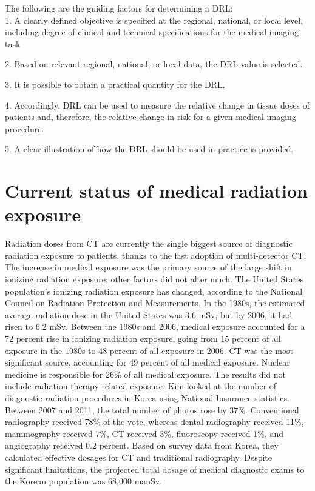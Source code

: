 \documentclass{article}
\begin{document}
The following are the guiding factors for determining a DRL:\\

1.	A clearly defined objective is specified at the regional, national, or local level, including degree of clinical and technical specifications for the medical imaging task

2.	Based on relevant regional, national, or local data, the DRL value is selected. 

3.	It is possible to obtain a practical quantity for the DRL. 

4.	Accordingly, DRL can be used to measure the relative change in tissue doses of patients and, therefore, the relative change in risk for a given medical imaging procedure. 

5.	A clear illustration of how the DRL should be used in practice is provided.

\section{Current status of medical radiation exposure}

\large Radiation doses from CT are currently the single biggest source of diagnostic radiation exposure to patients, thanks to the fast adoption of multi-detector CT. The increase in medical exposure was the primary source of the large shift in ionizing radiation exposure; other factors did not alter much. The United States population's ionizing radiation exposure has changed, according to the National Council on Radiation Protection and Measurements. In the 1980s, the estimated average radiation dose in the United States was 3.6 mSv, but by 2006, it had risen to 6.2 mSv. Between the 1980s and 2006, medical exposure accounted for a 72 percent rise in ionizing radiation exposure, going from 15 percent of all exposure in the 1980s to 48 percent of all exposure in 2006. CT was the most significant source, accounting for 49 percent of all medical exposure. Nuclear medicine is responsible for 26\% of all medical exposure. The results did not include radiation therapy-related exposure. Kim looked at the number of diagnostic radiation procedures in Korea using National Insurance statistics. Between 2007 and 2011, the total number of photos rose by 37\%. Conventional radiography received 78\% of the vote, whereas dental radiography received 11\%, mammography received 7\%, CT received 3\%, fluoroscopy received 1\%, and angiography received 0.2 percent. Based on survey data from Korea, they calculated effective dosages for CT and traditional radiography. Despite significant limitations, the projected total dosage of medical diagnostic exams to the Korean population was 68,000 manSv. \\
\end{document}
